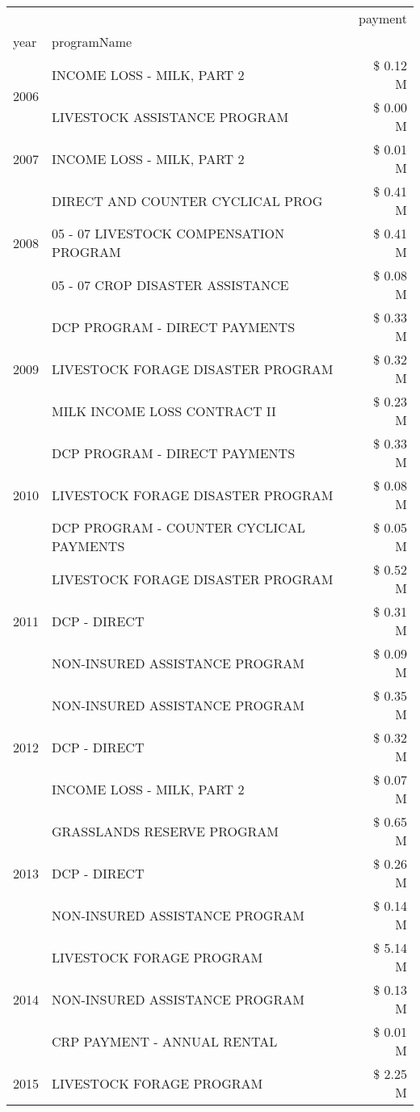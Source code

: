 \begin{tabular}{llr}
\toprule
 &  & payment \\
year & programName &  \\
\midrule
\multirow[t]{2}{*}{2006} & INCOME LOSS - MILK, PART 2 & \$ 0.12 M \\
 & LIVESTOCK ASSISTANCE PROGRAM & \$ 0.00 M \\
\cline{1-3}
2007 & INCOME LOSS - MILK, PART 2 & \$ 0.01 M \\
\cline{1-3}
\multirow[t]{3}{*}{2008} & DIRECT AND COUNTER CYCLICAL PROG & \$ 0.41 M \\
 & 05 - 07 LIVESTOCK COMPENSATION PROGRAM & \$ 0.41 M \\
 & 05 - 07 CROP DISASTER ASSISTANCE & \$ 0.08 M \\
\cline{1-3}
\multirow[t]{3}{*}{2009} & DCP PROGRAM - DIRECT PAYMENTS & \$ 0.33 M \\
 & LIVESTOCK FORAGE DISASTER  PROGRAM & \$ 0.32 M \\
 & MILK INCOME LOSS CONTRACT II & \$ 0.23 M \\
\cline{1-3}
\multirow[t]{3}{*}{2010} & DCP PROGRAM - DIRECT PAYMENTS & \$ 0.33 M \\
 & LIVESTOCK FORAGE DISASTER  PROGRAM & \$ 0.08 M \\
 & DCP PROGRAM - COUNTER CYCLICAL PAYMENTS & \$ 0.05 M \\
\cline{1-3}
\multirow[t]{3}{*}{2011} & LIVESTOCK FORAGE DISASTER PROGRAM & \$ 0.52 M \\
 & DCP - DIRECT & \$ 0.31 M \\
 & NON-INSURED ASSISTANCE PROGRAM & \$ 0.09 M \\
\cline{1-3}
\multirow[t]{3}{*}{2012} & NON-INSURED ASSISTANCE PROGRAM & \$ 0.35 M \\
 & DCP - DIRECT & \$ 0.32 M \\
 & INCOME LOSS - MILK, PART 2 & \$ 0.07 M \\
\cline{1-3}
\multirow[t]{3}{*}{2013} & GRASSLANDS RESERVE PROGRAM & \$ 0.65 M \\
 & DCP - DIRECT & \$ 0.26 M \\
 & NON-INSURED ASSISTANCE PROGRAM & \$ 0.14 M \\
\cline{1-3}
\multirow[t]{3}{*}{2014} & LIVESTOCK FORAGE PROGRAM & \$ 5.14 M \\
 & NON-INSURED ASSISTANCE PROGRAM & \$ 0.13 M \\
 & CRP PAYMENT - ANNUAL RENTAL & \$ 0.01 M \\
\cline{1-3}
\multirow[t]{3}{*}{2015} & LIVESTOCK FORAGE PROGRAM & \$ 2.25 M \\

\end{tabular}
